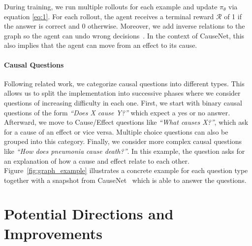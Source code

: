During training, we run multiple rollouts for each example and update $\pi_\theta$ via equation \eqref{eq:1}. For each rollout, the agent receives a terminal reward $\mathcal{R}$ of 1 if the answer is correct and 0 otherwise. 
Moreover, we add inverse relations to the graph so the agent can undo wrong decisions~\cite{Xiong2017DeePpath, Das2018Minerva}. In the context of CauseNet, this also implies that the agent can move from an effect to its cause.

\paragraph{Causal Questions}
Following related work, we categorize causal questions into different types. This allows us to split the implementation into successive phases where we consider questions of increasing difficulty in each one. First, we start with binary causal questions of the form \textit{``Does X cause Y?''} which expect a yes or no answer. Afterward, we move to Cause/Effect questions like \textit{``What causes X?''}, which ask for a cause of an effect or vice versa. Multiple choice questions can also be grouped into this category. Finally, we consider more complex causal questions like \textit{``How does pneumonia cause death?''}. In this example, the question asks for an explanation of how a cause and effect relate to each other. Figure~\ref{fig:graph_example} illustrates a concrete example for each question type together with a snapshot from CauseNet~\cite{Heindorf2020Causenet} which is able to answer the questions.




\section{Potential Directions and Improvements}
\label{sec3.3:dir}


